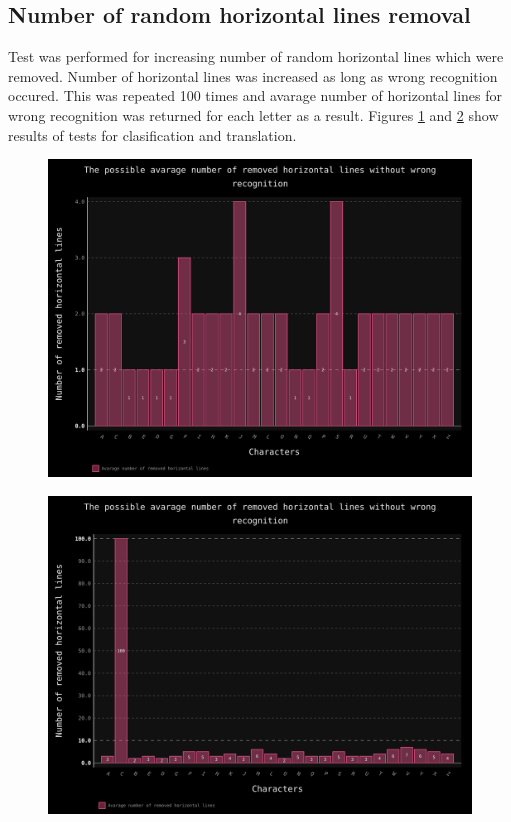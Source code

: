 \documentclass[a4paper]{article}
\begin{document}
\clearpage
\subsection{Number of random horizontal lines removal}
Test was performed for increasing number of random horizontal lines which were removed. Number of horizontal lines was increased as long as wrong recognition occured. This was repeated 100 times and avarage number of horizontal lines for wrong recognition was returned for each letter as a result. Figures \ref{hor_lines_trans} and \ref{hor_lines_clas} show results of tests for clasification and translation. 
\begin{figure}[ht]
	\centering
	\includegraphics[scale=0.7,keepaspectratio=true]{Charts/LinesHorTestPlanResultsChart_NormalTester.png}	
	\caption{}
	\label{hor_lines_trans}
\end{figure}

\begin{figure}[t]
	\centering
	\includegraphics[scale=0.7,keepaspectratio=true]{Charts/LinesHorTestPlanResultsChart_ClasifierTester.png}	
	\caption{}
	\label{hor_lines_clas}
\end{figure}
\end{document}
